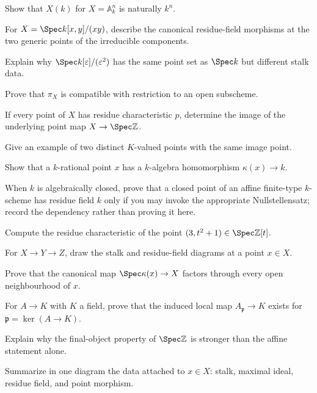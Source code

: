 \begin{exercise}\label{exer:vi21-e13}
Show that $X(k)$ for $X=\mathbb A^n_k$ is naturally $k^n$.
\end{exercise}
\begin{exercise}\label{exer:vi21-e14}
For $X=\Spec k[x,y]/(xy)$, describe the canonical residue-field morphisms at the two generic points of the irreducible components.
\end{exercise}
\begin{exercise}\label{exer:vi21-e15}
Explain why $\Spec k[\varepsilon]/(\varepsilon^2)$ has the same point set as $\Spec k$ but different stalk data.
\end{exercise}
\begin{exercise}\label{exer:vi21-e16}
Prove that $\pi_X$ is compatible with restriction to an open subscheme.
\end{exercise}
\begin{exercise}\label{exer:vi21-e17}
If every point of $X$ has residue characteristic $p$, determine the image of the underlying point map $X\to\Spec\mathbb Z$.
\end{exercise}
\begin{exercise}\label{exer:vi21-e18}
Give an example of two distinct $K$-valued points with the same image point.
\end{exercise}
\begin{exercise}\label{exer:vi21-e19}
Show that a $k$-rational point $x$ has a $k$-algebra homomorphism $\kappa(x)\to k$.
\end{exercise}
\begin{exercise}\label{exer:vi21-e20}
When $k$ is algebraically closed, prove that a closed point of an affine finite-type $k$-scheme has residue field $k$ only if you may invoke the appropriate Nullstellensatz; record the dependency rather than proving it here.
\end{exercise}
\begin{exercise}\label{exer:vi21-e21}
Compute the residue characteristic of the point $(3,t^2+1)\in\Spec\mathbb Z[t]$.
\end{exercise}
\begin{exercise}\label{exer:vi21-e22}
For $X\to Y\to Z$, draw the stalk and residue-field diagrams at a point $x\in X$.
\end{exercise}
\begin{exercise}\label{exer:vi21-e23}
Prove that the canonical map $\Spec\kappa(x)\to X$ factors through every open neighbourhood of $x$.
\end{exercise}
\begin{exercise}\label{exer:vi21-e24}
For $A\to K$ with $K$ a field, prove that the induced local map $A_{\mathfrak p}\to K$ exists for $\mathfrak p=\ker(A\to K)$.
\end{exercise}
\begin{exercise}\label{exer:vi21-e25}
Explain why the final-object property of $\Spec\mathbb Z$ is stronger than the affine statement alone.
\end{exercise}
\begin{exercise}\label{exer:vi21-e26}
Summarize in one diagram the data attached to $x\in X$: stalk, maximal ideal, residue field, and point morphism.
\end{exercise}
